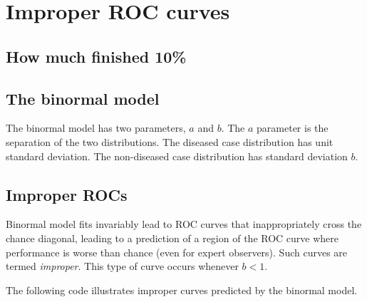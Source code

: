 \documentclass[
]{book}
\begin{document}
\hypertarget{improper-rocs}{%
\chapter{Improper ROC curves}\label{improper-rocs}}

\hypertarget{improper-rocs-how-much-finished}{%
\section{How much finished 10\%}\label{improper-rocs-how-much-finished}}

\hypertarget{the-binormal-model}{%
\section{The binormal model}\label{the-binormal-model}}

The binormal model has two parameters, \(a\) and \(b\). The \(a\) parameter is the separation of the two distributions. The diseased case distribution has unit standard deviation. The non-diseased case distribution has standard deviation \(b\).

\hypertarget{improper-rocs-1}{%
\section{Improper ROCs}\label{improper-rocs-1}}

Binormal model fits invariably lead to ROC curves that inappropriately cross the chance diagonal, leading to a prediction of a region of the ROC curve where performance is worse than chance (even for expert observers). Such curves are termed \emph{improper}. This type of curve occurs whenever \(b < 1\).

The following code illustrates improper curves predicted by the binormal model.
\end{document}
